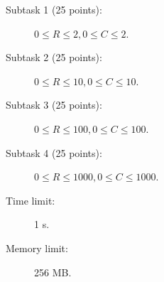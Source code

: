 \documentclass{../../../latex/boi2014-lt}
\begin{document}
    \begin{description}
        \item[Subtask 1 (25 points):] $0 \le R \le 2, 0 \le C \le 2$.
        \item[Subtask 2 (25 points):] $0 \le R \le 10, 0 \le C \le 10$.
        \item[Subtask 3 (25 points):] $0 \le R \le 100, 0 \le C \le 100$.
        \item[Subtask 4 (25 points):] $0 \le R \le 1000, 0 \le C \le 1000$.
    \end{description}

    \Constraints

    \begin{description}
        \item[Time limit:] 1 s.
        \item[Memory limit:] 256 MB.
    \end{description}

\end{document}
